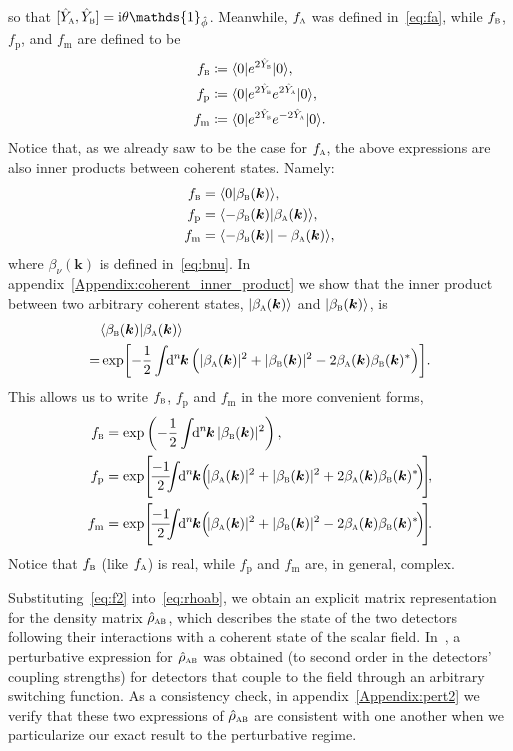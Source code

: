 \documentclass[pra,nofootinbib,floats,aps,twocolumn,tightenlines,superscriptaddress]{revtex4-1}
\renewcommand*\d[2][]{%
	\mathrm{d}%
	\ifx\relax#1\relax\else
	\rule{-0.02em}{1.5ex}^{#1}\rule{0.08em}{0ex}\!
	\fi
	#2\,
}
\newcommand{\ket}[1]{| {#1} \rangle}
\newcommand{\bra}[1]{\langle {#1} |}
\newcommand{\ii}{\mathrm{i}}
\newcommand{\rhoab}{\hat{\rho}_\textsc{ab}}
\newcommand{\Ya}{\hat{Y}_\textsc{a}}
\newcommand{\Yb}{\hat{Y}_\textsc{b}}
\newcommand{\fa}{f_\textsc{a}}
\newcommand{\fb}{f_\textsc{b}}
\newcommand{\fp}{f_\text{p}}
\newcommand{\fm}{f_\text{m}}
\newcommand{\ba}{\beta_\textsc{a}(\bm k)}
\newcommand{\bb}{\beta_\textsc{b}(\bm k)}
\newcommand{\bnu}{\beta_\nu(\bm k)}
\begin{document}
so that $[\Ya,\Yb]=\ii\theta\mathds{1}_{\hat{\phi}}$. Meanwhile, $\fa$ was defined in~\eqref{eq:fa}, while $\fb$, $\fp$, and $\fm$ are defined to be
\begin{align}
\label{eq:fb}
    \fb
    &\coloneqq
    \bra{0}e^{2\Yb}\ket{0},
    \\
\label{eq:fp}
    \fp
    &\coloneqq
    \bra{0}e^{2\Yb}e^{2\Ya}\ket{0},
    \\
\label{eq:fm}
    \fm
    &\coloneqq
    \bra{0}e^{2\Yb}e^{-2\Ya}\ket{0}.
\end{align}
Notice that, as we already saw to be the case for $\fa$, the above expressions are also inner products between coherent states. Namely:
\begin{align}
    f_\textsc{b}
    &=
    \bra{0} \bb\rangle,
    \\
    f_\text{p}
    &=
    \bra{-\bb} \ba \rangle,
    \\
    f_\text{m}
    &=
    \bra{-\bb} -\ba
    \rangle,
\end{align}
where $\bnu$ is defined in~\eqref{eq:bnu}. In appendix~\ref{Appendix:coherent_inner_product} we show that the inner product between two arbitrary coherent states, $\ket{\ba}$ and $\ket{\bb}$, is
\begin{align}
    &\langle\bb\ket{\ba}
    \notag\\
    =&
    \exp \!
    \left[
    -\frac{1}{2}
    \int\!\!\d[n]{\bm k}\!
    \left(
    |\ba|^2+
    |\bb|^2-
    2\ba\bb^*
    \right)
    \right]\!.
\end{align}
This allows us to write $\fb$, $\fp$ and $\fm$ in the more convenient forms,
\begin{align}
\label{eq:fb_final}
    \fb
    &=
    \exp\left(
    -\frac{1}{2}
    \int\!\!\d[n]{\bm k}
    |\bb|^2
    \right),
    \\
\label{eq:fp_final}
    f_\text{p}
    &=
    \exp\!\Bigg[\!\frac{-1}{2}
    \!\!\!\int\!\!\d[n]{\bm k}
    \!\Big(\!
    |\ba|^2
    +|\bb|^2
    +2\ba\bb^*
    \!\Big)\!\Bigg]\!,
    \\
\label{eq:fm_final}
    f_\text{m}
    &=
    \exp\!\Bigg[\!\frac{-1}{2}
    \!\!\!\int\!\!\d[n]{\bm k}
    \!\Big(\!
    |\ba|^2
    +|\bb|^2
    -2\ba\bb^*
    \!\Big)\!\Bigg]\!.
\end{align}
Notice that $\fb$ (like $\fa$) is real, while $\fp$ and $\fm$ are, in general, complex.

Substituting~\eqref{eq:f2} into~\eqref{eq:rhoab}, we obtain an explicit matrix representation for the density matrix $\rhoab$, which describes the state of the two detectors following their interactions with a coherent state of the scalar field. In~\cite{Simidzija2017b}, a perturbative expression for $\rhoab$ was obtained (to second order in the detectors' coupling strengths) for detectors that couple to the field through an arbitrary switching function. As a consistency check, in appendix~\ref{Appendix:pert2} we verify that these two expressions of $\rhoab$ are consistent with one another when we particularize our exact result to the perturbative regime.
\end{document}
